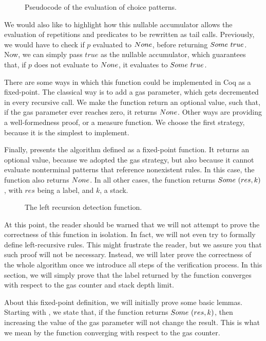\begin{figure}
    \centering
    
    \caption{Pseudocode of the evaluation of choice patterns.}
    \label{fig:evalchoice}
\end{figure}

We would also like to highlight
how this nullable accumulator allows
the evaluation of repetitions and predicates
to be rewritten as tail calls.
Previously,
we would have to check if $p$ evaluated to $None$,
before returning $Some\ true$.
Now, we can simply pass $true$ as the nullable accumulator,
which guarantees that, if $p$ does not evaluate to $None$,
it evaluates to $Some\ true$.

There are some ways in which this function
could be implemented in Coq as a fixed-point.
The classical way is to add a gas parameter,
which gets decremented in every recursive call.
We make the function return an optional value,
such that, if the gas parameter ever reaches zero,
it returns $None$.
Other ways are providing a well-formedness proof,
or a measure function.
We choose the first strategy,
because it is the simplest to implement.

Finally,
 presents the algorithm
defined as a fixed-point function.
It returns an optional value,
because we adopted the gas strategy,
but also because it cannot evaluate
nonterminal patterns that
reference nonexistent rules.
In this case,
the function also returns $None$.
In all other cases,
the function returns $Some\ (res, k)$,
with $res$ being a label, and $k$, a stack.
\begin{figure}
    \centering
    
    \caption{The left recursion detection function.}
    \label{fig:vr-function}
\end{figure}

At this point,
the reader should be warned that
we will not attempt to prove the correctness
of this function in isolation.
In fact, we will not even try to formally
define left-recursive rules.
This might frustrate the reader,
but we assure you that such proof will not be necessary.
Instead,
we will later prove the correctness of the whole algorithm
once we introduce all steps of the verification process.
In this section,
we will simply prove
that the label returned by the function
converges with respect to the gas counter and stack depth limit.

About this fixed-point definition,
we will initially prove some basic lemmas.
Starting with ,
we state that, if the function returns $Some\ (res, k)$,
then increasing the value of the gas parameter
will not change the result.
This is what we mean by
the function converging
with respect to the gas counter.

